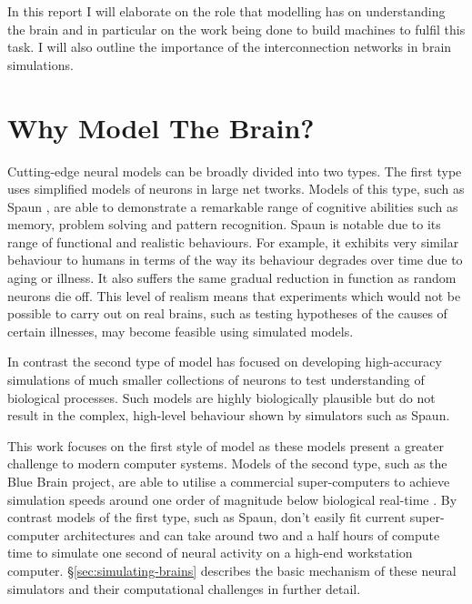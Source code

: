 	In this report I will elaborate on the role that modelling has on
	understanding the brain and in particular on the work being done to build
	machines to fulfil this task. I will also outline the importance of the
	interconnection networks in brain simulations.
	
	\section{Why Model The Brain?}
	
		
		
		Cutting-edge neural models can be broadly divided into two types. The first
		type uses simplified models of neurons in large net tworks. Models of this
		type, such as Spaun \cite{eliasmith12}, are able to demonstrate a remarkable
		range of cognitive abilities such as memory, problem solving and pattern
		recognition. Spaun is notable due to its range of functional and realistic
		behaviours. For example, it exhibits very similar behaviour to humans in
		terms of the way its behaviour degrades over time due to aging or illness.
		It also suffers the same gradual reduction in function as random neurons die
		off. This level of realism means that experiments which would not be
		possible to carry out on real brains, such as testing hypotheses of the
		causes of certain illnesses, may become feasible using simulated models.
		
		In contrast the second type of model has focused on developing
		high-accuracy simulations of much smaller collections of neurons to test
		understanding of biological processes. Such models are highly biologically
		plausible but do not result in the complex, high-level behaviour shown by
		simulators such as Spaun.
		
		This work focuses on the first style of model as these models present a
		greater challenge to modern computer systems. Models of the second type,
		such as the Blue Brain project, are able to utilise a commercial
		super-computers to achieve simulation speeds around one order of magnitude
		below biological real-time \cite{markram06}. By contrast models of the first
		type, such as Spaun, don't easily fit current super-computer architectures
		and can take around two and a half hours of compute time to simulate one
		second of neural activity on a high-end workstation computer.
		\S\ref{sec:simulating-brains} describes the basic mechanism of these neural
		simulators and their computational challenges in further detail.
	
